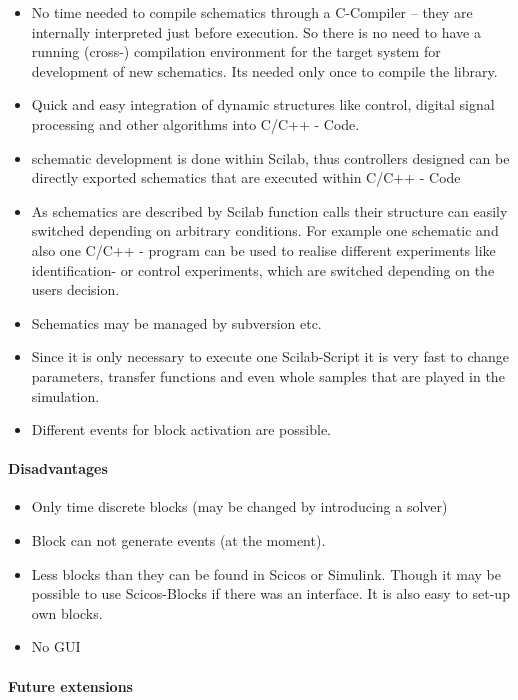 \documentclass[%
	pdftex,%
	a4paper,%
	oneside,%
	11pt,%
	halfparskip,%
	headsepline,%
	bibtotocnumbered,%
	idxtotoc%
]{scrartcl}
\begin{document}
\begin{itemize}
 \item No time needed to compile schematics through a C-Compiler -- they are internally interpreted just before execution. So there is no need to have a running (cross-) compilation environment for the target system for development of new schematics. Its needed only once to compile the library.
 \item Quick and easy integration of dynamic structures like control, digital signal processing and other algorithms into C/C++ - Code.
 \item schematic development is done within Scilab, thus controllers designed can be directly exported schematics that are executed within C/C++ - Code
 \item As schematics are described by Scilab function calls their structure can easily switched depending on arbitrary conditions. For example one schematic and also one C/C++ - program can be used to realise different experiments like identification- or control experiments, which are switched depending on the users decision.
 \item Schematics may be managed by subversion etc.
 \item Since it is only necessary to execute one Scilab-Script it is very fast to change parameters, transfer functions and even whole samples that are played in the simulation.
 \item Different events for block activation are possible.
\end{itemize}

\paragraph{Disadvantages}

\begin{itemize}
 \item Only time discrete blocks (may be changed by introducing a solver)
 \item Block can not generate events (at the moment).
 \item Less blocks than they can be found in Scicos or Simulink. Though it may be possible to use Scicos-Blocks if there was an interface. It is also easy to set-up own blocks.
 \item No GUI
\end{itemize}

\paragraph{Future extensions}
\end{document}
